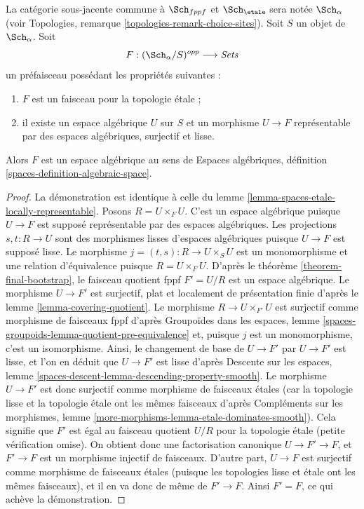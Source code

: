 \begin{lemma}
\label{lemma-spaces-smooth-locally-representable}
La catégorie sous-jacente commune à $\Sch_{fppf}$ et $\Sch_\etale$ sera notée
$\Sch_\alpha$
(voir Topologies, remarque \ref{topologies-remark-choice-sites}).
Soit $S$ un objet de $\Sch_\alpha$. Soit
$$
F : (\Sch_\alpha/S)^{opp} \longrightarrow \textit{Sets}
$$
un préfaisceau possédant les propriétés suivantes :
\begin{enumerate}
\item $F$ est un faisceau pour la topologie étale ;
\item il existe un espace algébrique $U$ sur $S$
et un morphisme $U \to F$ représentable par
des espaces algébriques, surjectif et lisse.
\end{enumerate}
Alors $F$ est un espace algébrique au sens de
Espaces algébriques, définition \ref{spaces-definition-algebraic-space}.
\end{lemma}

\begin{proof}
La démonstration est identique à celle du
lemme \ref{lemma-spaces-etale-locally-representable}.
Posons $R = U \times_F U$. C'est un espace algébrique puisque $U \to F$ est supposé
représentable par des espaces algébriques. Les projections $s, t : R \to U$ sont des
morphismes lisses d'espaces algébriques puisque $U \to F$ est supposé lisse.
Le morphisme $j = (t, s) : R \to U \times_S U$ est un monomorphisme et une
relation d'équivalence puisque $R = U \times_F U$. D'après le
théorème \ref{theorem-final-bootstrap},
le faisceau quotient fppf $F' = U/R$ est un espace algébrique.
Le morphisme $U \to F'$ est surjectif, plat et localement de présentation
finie d'après le lemme \ref{lemma-covering-quotient}.
Le morphisme $R \to U \times_{F'} U$ est surjectif comme morphisme de faisceaux
fppf d'après Groupoïdes dans les espaces, lemme
\ref{spaces-groupoids-lemma-quotient-pre-equivalence}
et, puisque $j$ est un monomorphisme, c'est un isomorphisme.
Ainsi, le changement de base de $U \to F'$ par $U \to F'$ est lisse,
et l'on en déduit que $U \to F'$ est lisse d'après
Descente sur les espaces, lemme \ref{spaces-descent-lemma-descending-property-smooth}.
Le morphisme $U \to F'$ est donc surjectif comme morphisme de faisceaux étales (car
la topologie lisse et la topologie étale ont les mêmes faisceaux d'après
Compléments sur les morphismes, lemme \ref{more-morphisms-lemma-etale-dominates-smooth}).
Cela signifie que $F'$ est égal au faisceau quotient $U/R$
pour la topologie étale (petite vérification omise). On obtient donc
une factorisation canonique $U \to F' \to F$, et $F' \to F$ est un morphisme
injectif de faisceaux. D'autre part, $U \to F$ est surjectif comme morphisme
de faisceaux étales (puisque les topologies lisse et étale ont les mêmes
faisceaux), et il en va donc de même de $F' \to F$. Ainsi $F' = F$,
ce qui achève la démonstration.
\end{proof}













